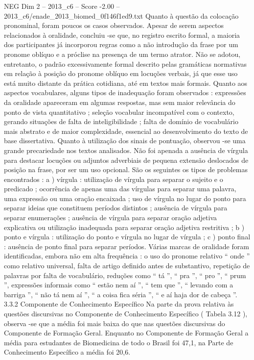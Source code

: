 \begin{textsample}{NEG Dim 2 – 2013\_c6 – Score -2.00 – 2013\_c6/enade\_2013\_biomed\_0f146f1ed9.txt}
Quanto à questão da colocação pronominal, foram poucos os casos observados.
Apesar de serem aspectos relacionados à oralidade, concluiu -se que, no registro escrito formal, a maioria dos participantes já incorporou regras como a não introdução da frase por um pronome oblíquo e a próclise na presença de um termo atrator.
Não se adotou, entretanto, o padrão excessivamente formal descrito pelas gramáticas normativas em relação à posição do pronome oblíquo em locuções verbais, já que esse uso está muito distante da prática cotidiana, até em textos mais formais.
Quanto aos aspectos vocabulares, alguns tipos de inadequação foram observados : expressões da oralidade apareceram em algumas respostas, mas sem maior relevância do ponto de vista quantitativo ; seleção vocabular incompatível com o contexto, gerando situações de falta de inteligibilidade ; falta de domínio de vocabulário mais abstrato e de maior complexidade, essencial ao desenvolvimento do texto de base dissertativa.
Quanto à utilização dos sinais de pontuação, observou -se uma grande precariedade nos textos analisados.
Não foi apenada a ausência de vírgula para destacar locuções ou adjuntos adverbiais de pequena extensão deslocados de posição na frase, por ser um uso opcional.
São os seguintes os tipos de problemas encontrados : a ) vírgula : utilização de vírgula para separar o sujeito e o predicado ; ocorrência de apenas uma das vírgulas para separar uma palavra, uma expressão ou uma oração encaixada ; uso de vírgula no lugar do ponto para separar ideias que constituem períodos distintos ; ausência de vírgula para separar enumerações ; ausência de vírgula para separar oração adjetiva explicativa ou utilização inadequada para separar oração adjetiva restritiva ; b ) ponto e vírgula : utilização do ponto e vírgula no lugar de vírgula ; c ) ponto final : ausência de ponto final para separar períodos.
Várias marcas de oralidade foram identificadas, embora não em alta frequência : o uso do pronome relativo “ onde ” como relativo universal, falta de artigo definido antes de substantivo, repetição de palavras por falta de vocabulário, reduções como “ tá ”, “ pra ”, “ pro ”, “ prum ”, expressões informais como “ estão nem aí ”, “ tem que ”, “ levando com a barriga ”, “ não tá nem aí ”, “ a coisa fica séria ”, “ e aí haja dor de cabeça ”. 3.3.2 Componente de Conhecimento Específico Na parte da prova relativa às questões discursivas no Componente de Conhecimento Específico ( Tabela 3.12 ), observa -se que a média foi mais baixa do que nas questões discursivas do Componente de Formação Geral.
Enquanto no Componente de Formação Geral a média para estudantes de Biomedicina de todo o Brasil foi 47,1, na Parte de Conhecimento Específico a média foi 20,6.

\end{textsample}
